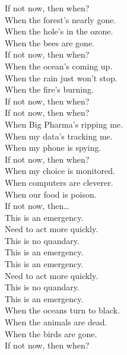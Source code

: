 
\label{album:lw}





If not now, then when? \\

When the forest's nearly gone. \\
When the hole's in the ozone. \\
When the bees are gone. \\
If not now, then when? \\

When the ocean's coming up. \\
When the rain just won't stop. \\
When the fire's burning. \\
If not now, then when? \\

If not now, then when? \\
When Big Pharma's ripping me. \\
When my data's tracking me. \\
When my phone is spying. \\
If not now, then when? \\

When my choice is monitored. \\
When computers are cleverer. \\
When our food is poison. \\
If not now, then… \\

This is an emergency. \\
Need to act more quickly. \\
This is no quandary. \\
This is an emergency. \\

This is an emergency. \\
Need to act more quickly. \\
This is no quandary. \\
This is an emergency. \\

When the oceans turn to black. \\
When the animals are dead. \\
When the birds are gone. \\
If not now, then when? \\

